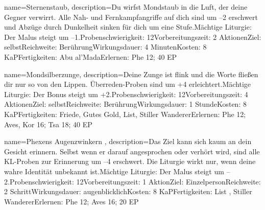 {
    name={Sternenstaub},
    description={Du wirfst Mondstaub in die Luft, der deine Gegner verwirrt. Alle Nah- und Fernkampfangriffe auf dich sind um –2 erschwert und Abzüge durch Dunkelheit sinken für dich um eine Stufe.\newline Mächtige Liturgie: Der Malus steigt um –1.\newline Probenschwierigkeit: 12\newline Vorbereitungszeit: 2 Aktionen\newline Ziel: selbst\newline Reichweite: Berührung\newline Wirkungsdauer: 4 Minuten\newline Kosten: 8 KaP\newline Fertigkeiten: Abu al'Mada\newline Erlernen: Phe 12; 40 EP}
}


{
    name={Mondsilberzunge},
    description={Deine Zunge ist flink und die Worte fließen dir nur so von den Lippen. Überreden-Proben sind um +4 erleichtert.\newline Mächtige Liturgie: Der Bonus steigt um +2.\newline Probenschwierigkeit: 12\newline Vorbereitungszeit: 4 Aktionen\newline Ziel: selbst\newline Reichweite: Berührung\newline Wirkungsdauer: 1 Stunde\newline Kosten: 8 KaP\newline Fertigkeiten: Friede, Gutes Gold, List, Stiller Wanderer\newline Erlernen: Phe 12; Aves, Kor 16; Tsa 18; 40 EP}
}


{
    name={Phexens Augenzwinkern },
    description={Das Ziel kann sich kaum an dein Gesicht erinnern. Selbst wenn er darauf angesprochen oder verhört wird, sind alle KL-Proben zur Erinnerung um –4 erschwert. Die Liturgie wirkt nur, wenn deine wahre Identität unbekannt ist.\newline Mächtige Liturgie: Der Malus steigt um –2.\newline Probenschwierigkeit: 12\newline Vorbereitungszeit: 1 Aktion\newline Ziel: Einzelperson\newline Reichweite: 2 Schritt\newline Wirkungsdauer: augenblicklich\newline Kosten: 8 KaP\newline Fertigkeiten: List , Stiller Wanderer\newline Erlernen: Phe 12; Aves 16; 20 EP}
}



